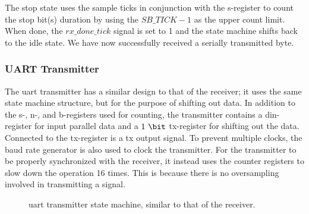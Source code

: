 \documentclass[main.tex]{subfiles}
\begin{document}
The stop state uses the sample ticks in conjunction with the s-register to count the stop bit(s) duration by using the $SB\_TICK-1$ as the upper count limit. When done, the  $rx\_done\_tick$ signal is set to 1 and the state machine shifts back to the idle state. We have now successfully received a serially  transmitted byte. %

\subsubsection{UART Transmitter}
The \gls{uart} transmitter has a similar design to that of the receiver; it uses the same state machine structure, but for the purpose of shifting out data. In addition to the s-, n-, and b-registers used for counting, the transmitter contains a din-register for input parallel data and a $1~\bit$ tx-register for shifting out the data. Connected to the tx-register is a tx output signal. To prevent multiple clocks, the baud rate generator is also used to clock the transmitter. For the transmitter to be properly synchronized with the receiver, it instead uses the counter registers to slow down the operation 16 times. This is because there is no oversampling involved in transmitting a signal.\\

\begin{figure}[!htp]
\begin{center}
\caption{\gls{uart} transmitter state machine, similar to that of the receiver.}
\label{fig:uarttx}
\end{center}
\end{figure}
\end{document}
